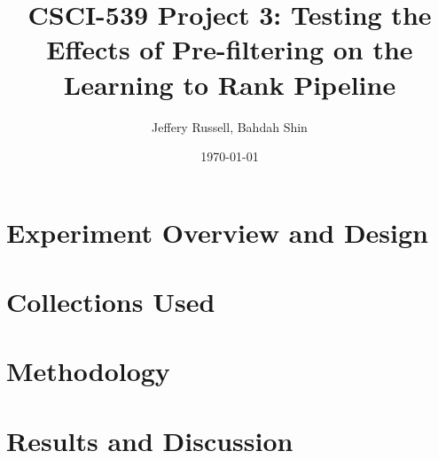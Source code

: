 \documentclass[letterpaper,12pt]{article}
\begin{document}
\title{CSCI-539 Project 3: Testing the Effects of Pre-filtering on the Learning to Rank Pipeline}
\author{Jeffery Russell, Bahdah Shin}

\date{\today}
\maketitle


\maketitle

\section{Experiment Overview and Design}





\section{Collections Used}



\section{Methodology}




\section{Results and Discussion}
\end{document}
